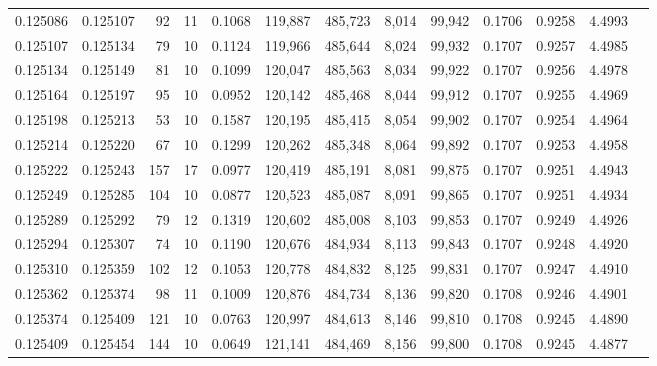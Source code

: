 \begin{tabular}{rrrrrrrrrrrrr}
0.125086 & 0.125107 &    92 &  11 &                                     0.1068 & 119,887 & 485,723 &   8,014 &  99,942 & 0.1706 & 0.9258 & 4.4993 \\
0.125107 & 0.125134 &    79 &  10 &                                     0.1124 & 119,966 & 485,644 &   8,024 &  99,932 & 0.1707 & 0.9257 & 4.4985 \\
0.125134 & 0.125149 &    81 &  10 &                                     0.1099 & 120,047 & 485,563 &   8,034 &  99,922 & 0.1707 & 0.9256 & 4.4978 \\
0.125164 & 0.125197 &    95 &  10 &                                     0.0952 & 120,142 & 485,468 &   8,044 &  99,912 & 0.1707 & 0.9255 & 4.4969 \\
0.125198 & 0.125213 &    53 &  10 &                                     0.1587 & 120,195 & 485,415 &   8,054 &  99,902 & 0.1707 & 0.9254 & 4.4964 \\
0.125214 & 0.125220 &    67 &  10 &                                     0.1299 & 120,262 & 485,348 &   8,064 &  99,892 & 0.1707 & 0.9253 & 4.4958 \\
0.125222 & 0.125243 &   157 &  17 &                                     0.0977 & 120,419 & 485,191 &   8,081 &  99,875 & 0.1707 & 0.9251 & 4.4943 \\
0.125249 & 0.125285 &   104 &  10 &                                     0.0877 & 120,523 & 485,087 &   8,091 &  99,865 & 0.1707 & 0.9251 & 4.4934 \\
0.125289 & 0.125292 &    79 &  12 &                                     0.1319 & 120,602 & 485,008 &   8,103 &  99,853 & 0.1707 & 0.9249 & 4.4926 \\
0.125294 & 0.125307 &    74 &  10 &                                     0.1190 & 120,676 & 484,934 &   8,113 &  99,843 & 0.1707 & 0.9248 & 4.4920 \\
0.125310 & 0.125359 &   102 &  12 &                                     0.1053 & 120,778 & 484,832 &   8,125 &  99,831 & 0.1707 & 0.9247 & 4.4910 \\
0.125362 & 0.125374 &    98 &  11 &                                     0.1009 & 120,876 & 484,734 &   8,136 &  99,820 & 0.1708 & 0.9246 & 4.4901 \\
0.125374 & 0.125409 &   121 &  10 &                                     0.0763 & 120,997 & 484,613 &   8,146 &  99,810 & 0.1708 & 0.9245 & 4.4890 \\
0.125409 & 0.125454 &   144 &  10 &                                     0.0649 & 121,141 & 484,469 &   8,156 &  99,800 & 0.1708 & 0.9245 & 4.4877 \\

\end{tabular}
